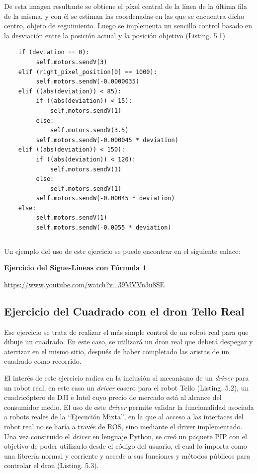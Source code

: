 De esta imagen resultante se obtiene el píxel central de la línea de la última fila de la misma, y con él se estiman las coordenadas en las que se encuentra dicho centro, objeto de seguimiento. Luego se implementa un sencillo control basado en la desviación entre la posición actual y la posición objetivo (Listing. 5.1)

\begin{verbatim}
    if (deviation == 0):
         self.motors.sendV(3)
    elif (right_pixel_position[0] == 1000):
         self.motors.sendW(-0.0000035)
    elif ((abs(deviation)) < 85):
         if ((abs(deviation)) < 15):
             self.motors.sendV(1)
         else:
             self.motors.sendV(3.5)
         self.motors.sendW(-0.000045 * deviation)
    elif ((abs(deviation)) < 150):
         if ((abs(deviation)) < 120):
             self.motors.sendV(1)
         else:
             self.motors.sendV(1)
         self.motors.sendW(-0.00045 * deviation)
    else:
         self.motors.sendV(1)
         self.motors.sendW(-0.0055 * deviation)
\end{verbatim}
\begin{lstlisting}[caption=Control basado en desviación]
\end{lstlisting}

Un ejemplo del uso de este ejercicio se puede encontrar en el siguiente enlace:

\textbf{Ejercicio del Sigue-Líneas con Fórmula 1}

\url{https://www.youtube.com/watch?v=39MVVn3u8SE}

\subsection{Ejercicio del Cuadrado con el dron Tello Real}

Ese ejercicio se trata de realizar el más simple control de un robot real para que dibuje un cuadrado. En este caso, se utilizará un dron real que deberá despegar y aterrizar en el mismo sitio, después de haber completado las aristas de un cuadrado como recorrido.

El interés de este ejercicio radica en la inclusión al mecanismo de un \textit{driver} para un robot real, en este caso un \textit{driver} casero para el robot Tello (Listing. 5.2), un cuadricóptero de DJI e Intel cuyo precio de mercado está al alcance del consumidor medio. El uso de este \textit{driver} permite validar la funcionalidad asociada a robots reales de la ``Ejecución Mixta'', en la que al acceso a las interfaces del robot real no se haría a través de ROS, sino mediante el driver implementado. Una vez construido el \textit{driver} en lenguaje Python, se creó un paquete PIP con el objetivo de poder utilizarlo desde el código del usuario, el cual lo importa como una librería normal y corriente y accede a sus funciones y métodos públicos para controlar el dron (Listing. 5.3). 

